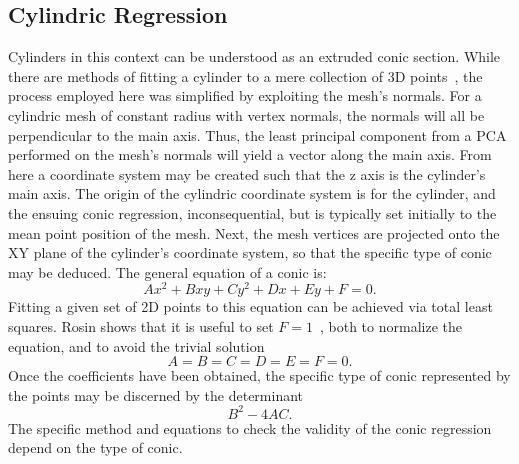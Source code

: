 \subsection{Cylindric Regression}
Cylinders in this context can be understood as an extruded conic section.
While there are methods of fitting a cylinder to a mere collection of 3D points~\cite{PCL_cyl_regression}, the process employed here was simplified by exploiting the mesh's normals.
For a cylindric mesh of constant radius with vertex normals, the normals will all be perpendicular to the main axis.
Thus, the least principal component from a PCA performed on the mesh's normals will yield a vector along the main axis.
From here a coordinate system may be created such that the z axis is the cylinder's main axis.
The origin of the cylindric coordinate system is for the cylinder, and the ensuing conic regression, inconsequential, but is typically set initially to the mean point position of the mesh.
Next, the mesh vertices are projected onto the XY plane of the cylinder's coordinate system, so that the specific type of conic may be deduced.
The general equation of a conic is:
\begin{equation}\label{eq:gen_conic}
	Ax^2 + Bxy + Cy^2 + Dx + Ey + F = 0.
\end{equation}
Fitting a given set of 2D points to this equation can be achieved via total least squares.
Rosin shows that it is useful to set $F=1$~\cite{Ellipse_least_squares}, both to normalize the equation, and to avoid the trivial solution
\begin{equation*}
	A = B = C = D = E = F = 0.
\end{equation*}
Once the coefficients have been obtained, the specific type of conic represented by the points may be discerned by the determinant
\begin{equation*}
	B^2 - 4AC.
\end{equation*}
The specific method and equations to check the validity of the conic regression depend on the type of conic.

